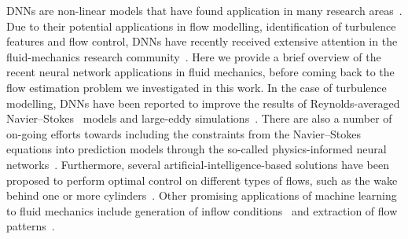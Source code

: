 DNNs are non-linear models that have found application in many research areas~\citep{jean2016combining,de2018clinically,norouzzadeh2018automatically,ham2019deep,udrescu2020ai,vinuesa2020role}.
Due to their potential applications in flow modelling, identification of turbulence features and flow control, DNNs have recently received extensive attention in the fluid-mechanics research community~\citep{kutz2017deep,jimenez2018machine,duraisamy2019turbulence,brunton2020machine}.
Here we provide a brief overview of the recent neural network applications in fluid mechanics, before coming back to the flow estimation problem we investigated in this work.
In the case of turbulence modelling, DNNs have been reported to improve the results of Reynolds-averaged Navier--Stokes~\cite[RANS, ][]{ling2016reynolds,wu2017priori} models and large-eddy simulations~\cite[LES, ][]{maulik2019subgrid,lapeyre2019training,beck2019deep}.
There are also a number of on-going efforts towards including the constraints from the Navier--Stokes equations into prediction models through the so-called physics-informed neural networks~\citep{wang2017physics,raissi2019physics}.
Furthermore, several artificial-intelligence-based solutions have been proposed to perform optimal control on different types of flows, such as the wake behind one or more cylinders~\citep{rabault2019artificial,raibaudo2020machine}.
Other promising applications of machine learning to fluid mechanics include generation of inflow conditions~\citep{fukami2019synthetic} and extraction of flow patterns~\citep{raissi2020hidden}.

